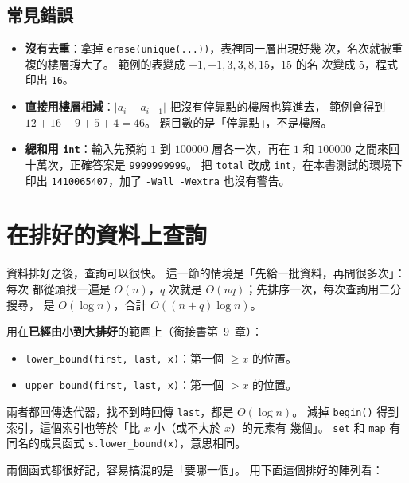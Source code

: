 \subsection{常見錯誤}

\begin{itemize}
\item \textbf{沒有去重}：拿掉 \texttt{erase(unique(...))}，表裡同一層出現好幾
次，名次就被重複的樓層撐大了。 範例的表變成 $-1, -1, 3, 3, 8, 15$，$15$ 的名
次變成 $5$，程式印出 \texttt{16}。
\item \textbf{直接用樓層相減}：$|a_i - a_{i-1}|$ 把沒有停靠點的樓層也算進去，
範例會得到 $12 + 16 + 9 + 5 + 4 = 46$。 題目數的是「停靠點」，不是樓層。
\item \textbf{總和用 \texttt{int}}：輸入先預約 $1$ 到 $100000$ 層各一次，再在
$1$ 和 $100000$ 之間來回十萬次，正確答案是 \texttt{9999999999}。 把
\texttt{total} 改成 \texttt{int}，在本書測試的環境下印出
\texttt{1410065407}，加了 \texttt{-Wall -Wextra} 也沒有警告。
\end{itemize}

\section{在排好的資料上查詢}
\label{sec:srt-query}

資料排好之後，查詢可以很快。 這一節的情境是「先給一批資料，再問很多次」：每次
都從頭找一遍是 $O(n)$，$q$ 次就是 $O(nq)$；先排序一次，每次查詢用二分搜尋，
是 $O(\log n)$，合計 $O((n + q) \log n)$。

\begin{bridgerecap}
用在\textbf{已經由小到大排好}的範圍上（銜接書第~9~章）：
\begin{itemize}
\item \texttt{lower\_bound(first, last, x)}：第一個 $\ge x$ 的位置。
\item \texttt{upper\_bound(first, last, x)}：第一個 $> x$ 的位置。
\end{itemize}
兩者都回傳迭代器，找不到時回傳 \texttt{last}，都是 $O(\log n)$。 減掉
\texttt{begin()} 得到索引，這個索引也等於「比 $x$ 小（或不大於 $x$）的元素有
幾個」。 \texttt{set} 和 \texttt{map} 有同名的成員函式
\texttt{s.lower\_bound(x)}，意思相同。
\end{bridgerecap}

兩個函式都很好記，容易搞混的是「要哪一個」。 用下面這個排好的陣列看：

